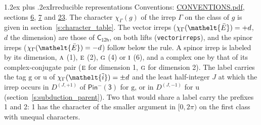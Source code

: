 \documentclass[10pt,a4paper]{article}
\makeatletter
\renewcommand\section{\@startsection{section}{1}{\z@}{-3ex plus -1ex minus -.2ex}%
  {1.2ex plus .2ex}{\normalfont\large\sffamily\bfseries\color{parttitle}}}
\numberwithin{equation}{section}
\newcommand{\eltfont}[1]{{\let\sigma\eltsigma\mathelt{#1}}}
\newcommand{\grp}[1]{\mathsf{#1}}
\newcommand{\irr}[1]{\text{\normalfont\scshape #1}}
\newcommand{\elt}[1]{\eltfont{#1}}
\newcommand{\ptag}[1]{\mathrm{#1}}
\newcommand{\irrJp}[2]{D^{(#1,#2)}}
\newcommand{\irchar}[1]{\chi_{#1}}
\newcommand{\barred}[1]{\bar{#1}}
\newcommand{\lift}[1]{\tilde{#1}}
\makeatother
\begin{document}
\section{Irreducible representations}\label{s:irreps}
Conventions: \href{../../CONVENTIONS.pdf}{CONVENTIONS.pdf}, sections \href{../../../rotation/CONVENTIONS.pdf\#conv.6}{6}, \href{../../../rotation/CONVENTIONS.pdf\#conv.7}{7} and \href{../../CONVENTIONS.pdf\#conv.23}{23}.
\leavevmode\label{n:function.character}\label{n:irrep.Gamma}The character $\irchar{\Gamma}(g)$ of the irrep $\Gamma$ on the class of $g$ is given in section~\ref{s:character_table}. \label{n:index.dimension}The vector irreps ($\irchar{\Gamma}(\elt{\barred{E}}) = +d$, $d$ the dimension) are those of \href{../../../rotation/data/pdf/C12h.pdf}{$\grp{C_{12h}}$}, on both lifts (\texttt{vectorirreps}), and the spinor irreps ($\irchar{\Gamma}(\elt{\barred{E}}) = -d$) follow below the rule. A spinor irrep is labeled by its dimension, $\irr{a}$ (1), $\irr{e}$ (2), $\irr{g}$ (4) or $\irr{i}$ (6), and a complex one by that of its complex-conjugate pair ($\irr{e}$ for dimension 1, $\irr{g}$ for dimension 2). The label carries the tag $\ptag{g}$ or $\ptag{u}$ of $\irchar{\Gamma}(\elt{\lift{i}}) = \pm d$ and the least half-integer $J$ at which the irrep occurs in $\irrJp{J}{+1}$ of $\grp{Pin^{-}(3)}$ for $\ptag{g}$, or in $\irrJp{J}{-1}$ for $\ptag{u}$ (section~\ref{s:subduction_parent}). Two that would share a label carry the prefixes 1 and 2: 1 has the character of the smaller argument in $[0, 2\pi)$ on the first class with unequal characters.
\end{document}
